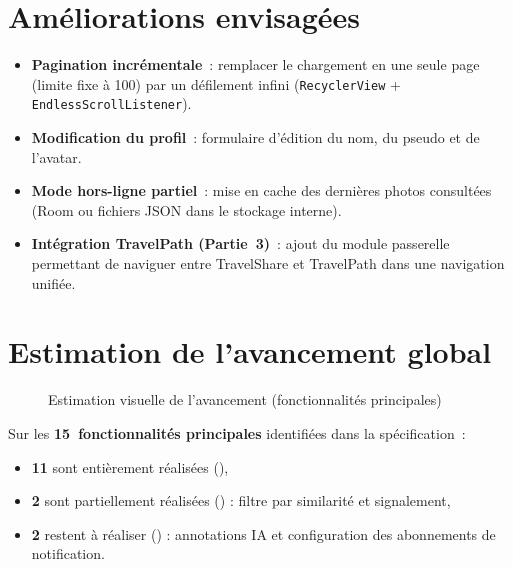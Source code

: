 \documentclass[12pt, a4paper, openany]{report}
\newcommand{\cmark}{\textcolor{success}{\ding{51}}}
\newcommand{\xmark}{\textcolor{danger}{\ding{55}}}
\newcommand{\pmark}{\textcolor{warning}{\ding{119}}}
\begin{document}
\section{Améliorations envisagées}

\begin{itemize}
  \item \textbf{Pagination incrémentale}~: remplacer le chargement en une seule page
        (limite fixe à 100) par un défilement infini (\texttt{RecyclerView} +
        \texttt{EndlessScrollListener}).
  \item \textbf{Modification du profil}~: formulaire d'édition du nom, du pseudo et de
        l'avatar.
  \item \textbf{Mode hors-ligne partiel}~: mise en cache des dernières photos consultées
        (Room ou fichiers JSON dans le stockage interne).
  \item \textbf{Intégration TravelPath (Partie~3)}~: ajout du module passerelle permettant
        de naviguer entre TravelShare et TravelPath dans une navigation unifiée.
\end{itemize}

\section{Estimation de l'avancement global}

\begin{figure}[H]
\centering
{}
\caption{Estimation visuelle de l'avancement (fonctionnalités principales)}
\label{fig:progress}
\end{figure}

Sur les \textbf{15~fonctionnalités principales} identifiées dans la spécification~:
\begin{itemize}
  \item \textbf{11} sont entièrement réalisées (\cmark),
  \item \textbf{2} sont partiellement réalisées (\pmark) : filtre par similarité et signalement,
  \item \textbf{2} restent à réaliser (\xmark) : annotations IA et configuration des abonnements de notification.
\end{itemize}
\end{document}
